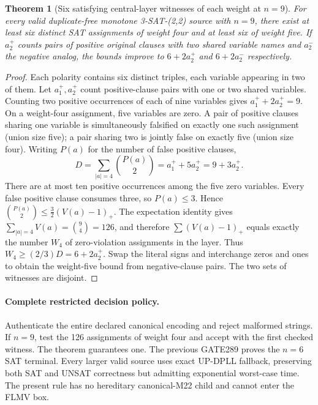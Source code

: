 \documentclass[11pt]{article}
\newtheorem{theorem}{Theorem}
\begin{document}
\begin{theorem}[Six satisfying central-layer witnesses of each weight at $n=9$]
For every valid duplicate-free monotone 3-SAT-(2,2) source with $n=9$, there exist at least six distinct SAT assignments of weight four and at least six of weight five. If $a_2^+$ counts pairs of positive original clauses with two shared variable names and $a_2^-$ the negative analog, the bounds improve to $6+2a_2^+$ and $6+2a_2^-$ respectively.
\end{theorem}
\begin{proof}
Each polarity contains six distinct triples, each variable appearing in two of them. Let $a_1^+,a_2^+$ count positive-clause pairs with one or two shared variables. Counting two positive occurrences of each of nine variables gives $a_1^++2a_2^+=9$. On a weight-four assignment, five variables are zero. A pair of positive clauses sharing one variable is simultaneously falsified on exactly one such assignment (union size five); a pair sharing two is jointly false on exactly five (union size four). Writing $P(a)$ for the number of false positive clauses,
\[
D=\sum_{|a|=4}\binom{P(a)}2=a_1^++5a_2^+=9+3a_2^+.
\]
There are at most ten positive occurrences among the five zero variables. Every false positive clause consumes three, so $P(a)\le3$. Hence
$\binom{P(a)}2\le\frac32(V(a)-1)_+$.
The expectation identity gives $\sum_{|a|=4}V(a)=\binom94=126$, and therefore $\sum(V(a)-1)_+$ equals exactly the number $W_4$ of zero-violation assignments in the layer. Thus $W_4\ge(2/3)D=6+2a_2^+$. Swap the literal signs and interchange zeros and ones to obtain the weight-five bound from negative-clause pairs. The two sets of witnesses are disjoint.
\end{proof}

\paragraph{Complete restricted decision policy.}
Authenticate the entire declared canonical encoding and reject malformed strings. If $n=9$, test the 126 assignments of weight four and accept with the first checked witness. The theorem guarantees one. The previous GATE289 proves the $n=6$ SAT terminal. Every larger valid source uses exact UP-DPLL fallback, preserving both SAT and UNSAT correctness but admitting exponential worst-case time. The present rule has no hereditary canonical-M22 child and cannot enter the FLMV box.
\end{document}
